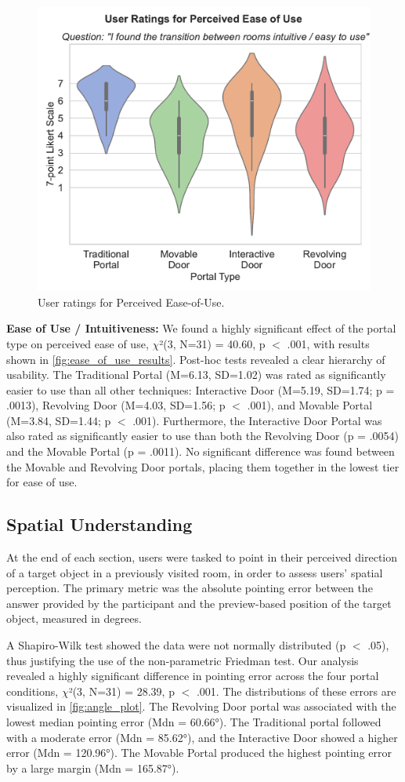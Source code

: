\begin{figure}[t]
\centering
\includegraphics[width=.6\linewidth]{NOVAthesisFiles/Images/graphs/ease_of_use_violin_plot.pdf}
\caption{User ratings for Perceived Ease-of-Use.}
\label{fig:ease_of_use_results}
\end{figure}

\textbf{Ease of Use / Intuitiveness:} We found a highly significant effect of the portal type on perceived ease of use, 
$\chi$²(3, N=31) = 40.60, p $<$ .001, with results shown in \autoref{fig:ease_of_use_results}. Post-hoc tests revealed a 
clear hierarchy of usability. The Traditional Portal (M=6.13, SD=1.02) was rated as significantly easier to use than all 
other techniques: Interactive Door (M=5.19, SD=1.74; p = .0013), Revolving Door (M=4.03, SD=1.56; p $<$ .001), and 
Movable Portal (M=3.84, SD=1.44; p $<$ .001). Furthermore, the Interactive Door Portal was also rated as significantly easier 
to use than both the Revolving Door (p = .0054) and the Movable Portal (p = .0011). No significant difference was found between 
the Movable and Revolving Door portals, placing them together in the lowest tier for ease of use.

\subsection{Spatial Understanding}

At the end of each section, users were tasked to point in their perceived direction of a target object in a previously visited room, 
in order to assess users' spatial perception. The primary metric was the absolute pointing error between the answer provided by the 
participant and the preview-based position of the target object, measured in degrees.

A Shapiro-Wilk test showed the data were not normally distributed (p $<$ .05), thus justifying the use of the non-parametric 
Friedman test. Our analysis revealed a highly significant difference in pointing error across the four portal conditions, 
$\chi$²(3, N=31) = 28.39, p $<$ .001. The distributions of these errors are visualized in \autoref{fig:angle_plot}. 
The Revolving Door portal was associated with the lowest median pointing error (Mdn = 60.66°). The Traditional portal 
followed with a moderate error (Mdn = 85.62°), and the Interactive Door showed a higher error (Mdn = 120.96°). 
The Movable Portal produced the highest pointing error by a large margin (Mdn = 165.87°).

